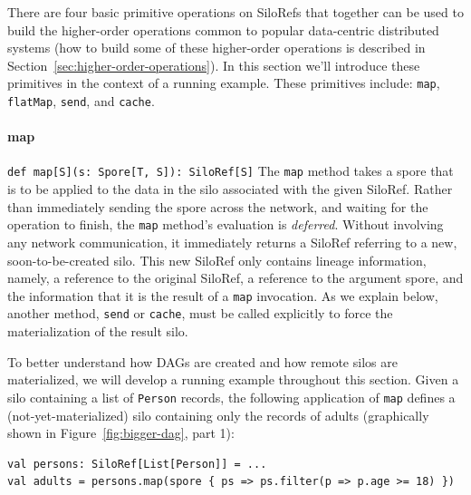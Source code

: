 \documentclass{jfp1}
\begin{document}
There are four basic primitive operations on SiloRefs that together can be used
to build the higher-order operations common to popular data-centric distributed
systems (how to build some of these higher-order operations is described in
Section~\ref{sec:higher-order-operations}). In this section we'll introduce
these primitives in the context of a running example. These primitives include:
\verb|map|, \verb|flatMap|, \verb|send|, and \verb|cache|.

\paragraph{map}%
%
\texttt{def map[S](s: Spore[T, S]): SiloRef[S]} \newline
%
The \verb|map| method takes a spore that is to be applied to the data in the
silo associated with the given SiloRef. Rather than immediately sending the
spore across the network, and waiting for the operation to finish, the
\verb|map| method's evaluation is \emph{deferred}. Without involving any network
communication, it immediately returns a SiloRef referring to a new,
soon-to-be-created silo. This new SiloRef only contains lineage information,
namely, a reference to the original SiloRef, a reference to the argument spore,
and the information that it is the result of a \verb|map| invocation. As we
explain below, another method, \verb|send| or \verb|cache|, must be called
explicitly to force the materialization of the result silo.

To better understand how DAGs are created and how remote silos are materialized,
we will develop a running example throughout this section. Given a silo
containing a list of \verb|Person| records, the following application of
\verb|map| defines a (not-yet-materialized) silo containing only the records of
adults (graphically shown in Figure~\ref{fig:bigger-dag}, part 1):

\begin{lstlisting}
val persons: SiloRef[List[Person]] = ...
val adults = persons.map(spore { ps => ps.filter(p => p.age >= 18) })
\end{lstlisting}
\end{document}
